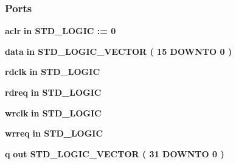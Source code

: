 \subsubsection*{Ports}
 \begin{DoxyCompactItemize}
\item 
{\bf aclr}  {\bfseries {\bfseries \textcolor{keywordflow}{in}\textcolor{vhdlchar}{ }}} {\bfseries \textcolor{comment}{S\+T\+D\+\_\+\+L\+O\+G\+IC}\textcolor{vhdlchar}{ }\textcolor{vhdlchar}{ }\textcolor{vhdlchar}{\+:}\textcolor{vhdlchar}{=}\textcolor{vhdlchar}{ }\textcolor{vhdlchar}{ }\textcolor{vhdlchar}{\textquotesingle{}}\textcolor{vhdlchar}{ } \textcolor{vhdldigit}{0} \textcolor{vhdlchar}{ }\textcolor{vhdlchar}{\textquotesingle{}}\textcolor{vhdlchar}{ }} 
\item 
{\bf data}  {\bfseries {\bfseries \textcolor{keywordflow}{in}\textcolor{vhdlchar}{ }}} {\bfseries \textcolor{comment}{S\+T\+D\+\_\+\+L\+O\+G\+I\+C\+\_\+\+V\+E\+C\+T\+OR}\textcolor{vhdlchar}{ }\textcolor{vhdlchar}{(}\textcolor{vhdlchar}{ }\textcolor{vhdlchar}{ } \textcolor{vhdldigit}{15} \textcolor{vhdlchar}{ }\textcolor{keywordflow}{D\+O\+W\+N\+TO}\textcolor{vhdlchar}{ }\textcolor{vhdlchar}{ } \textcolor{vhdldigit}{0} \textcolor{vhdlchar}{ }\textcolor{vhdlchar}{)}\textcolor{vhdlchar}{ }} 
\item 
{\bf rdclk}  {\bfseries {\bfseries \textcolor{keywordflow}{in}\textcolor{vhdlchar}{ }}} {\bfseries \textcolor{comment}{S\+T\+D\+\_\+\+L\+O\+G\+IC}\textcolor{vhdlchar}{ }} 
\item 
{\bf rdreq}  {\bfseries {\bfseries \textcolor{keywordflow}{in}\textcolor{vhdlchar}{ }}} {\bfseries \textcolor{comment}{S\+T\+D\+\_\+\+L\+O\+G\+IC}\textcolor{vhdlchar}{ }} 
\item 
{\bf wrclk}  {\bfseries {\bfseries \textcolor{keywordflow}{in}\textcolor{vhdlchar}{ }}} {\bfseries \textcolor{comment}{S\+T\+D\+\_\+\+L\+O\+G\+IC}\textcolor{vhdlchar}{ }} 
\item 
{\bf wrreq}  {\bfseries {\bfseries \textcolor{keywordflow}{in}\textcolor{vhdlchar}{ }}} {\bfseries \textcolor{comment}{S\+T\+D\+\_\+\+L\+O\+G\+IC}\textcolor{vhdlchar}{ }} 
\item 
{\bf q}  {\bfseries {\bfseries \textcolor{keywordflow}{out}\textcolor{vhdlchar}{ }}} {\bfseries \textcolor{comment}{S\+T\+D\+\_\+\+L\+O\+G\+I\+C\+\_\+\+V\+E\+C\+T\+OR}\textcolor{vhdlchar}{ }\textcolor{vhdlchar}{(}\textcolor{vhdlchar}{ }\textcolor{vhdlchar}{ } \textcolor{vhdldigit}{31} \textcolor{vhdlchar}{ }\textcolor{keywordflow}{D\+O\+W\+N\+TO}\textcolor{vhdlchar}{ }\textcolor{vhdlchar}{ } \textcolor{vhdldigit}{0} \textcolor{vhdlchar}{ }\textcolor{vhdlchar}{)}\textcolor{vhdlchar}{ }} 

\end{DoxyCompactItemize}

